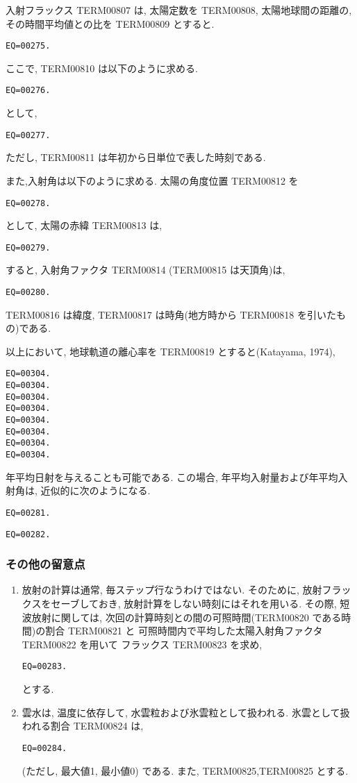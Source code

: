 入射フラックス TERM00807 は,
太陽定数を TERM00808, 
太陽地球間の距離の, 
その時間平均値との比を TERM00809 とすると.
%
\begin{verbatim}
EQ=00275.
\end{verbatim}
ここで, TERM00810 は以下のように求める.
%
\begin{verbatim}
EQ=00276.
\end{verbatim}
として,
\begin{verbatim}
EQ=00277.
\end{verbatim}
ただし, TERM00811 は年初から日単位で表した時刻である.

また,入射角は以下のように求める.
太陽の角度位置 TERM00812 を
\begin{verbatim}
EQ=00278.
\end{verbatim}
として,  太陽の赤緯 TERM00813 は,
\begin{verbatim}
EQ=00279.
\end{verbatim}
%
すると, 入射角ファクタ TERM00814 (TERM00815 は天頂角)は,
\begin{verbatim}
EQ=00280.
\end{verbatim}
TERM00816 は緯度,
TERM00817 は時角(地方時から TERM00818 を引いたもの)である.

以上において, 地球軌道の離心率を TERM00819 とすると(Katayama, 1974),
\begin{verbatim}
EQ=00304.
EQ=00304.
EQ=00304.
EQ=00304.
EQ=00304.
EQ=00304.
EQ=00304.
EQ=00304.
\end{verbatim}

年平均日射を与えることも可能である.
この場合, 年平均入射量および年平均入射角は, 
近似的に次のようになる.
%
\begin{verbatim}
EQ=00281.
\end{verbatim}
%
\begin{verbatim}
EQ=00282.
\end{verbatim}

\subsubsection{その他の留意点}

\begin{enumerate}
\item 放射の計算は通常, 毎ステップ行なうわけではない.
      そのために, 放射フラックスをセーブしておき, 
      放射計算をしない時刻にはそれを用いる.
      その際, 短波放射に関しては,
      次回の計算時刻との間の可照時間(TERM00820 である時間)の割合 TERM00821 と
      可照時間内で平均した太陽入射角ファクタ TERM00822 を用いて
      フラックス TERM00823 を求め,
      \begin{verbatim}
EQ=00283.
\end{verbatim}
      とする.


\item 雲水は, 温度に依存して, 
      水雲粒および氷雲粒として扱われる.
      氷雲として扱われる割合 TERM00824 は,
      \begin{verbatim}
EQ=00284.
\end{verbatim}
      (ただし, 最大値1, 最小値0) である. また,
      TERM00825,TERM00825 とする.

\end{enumerate}





